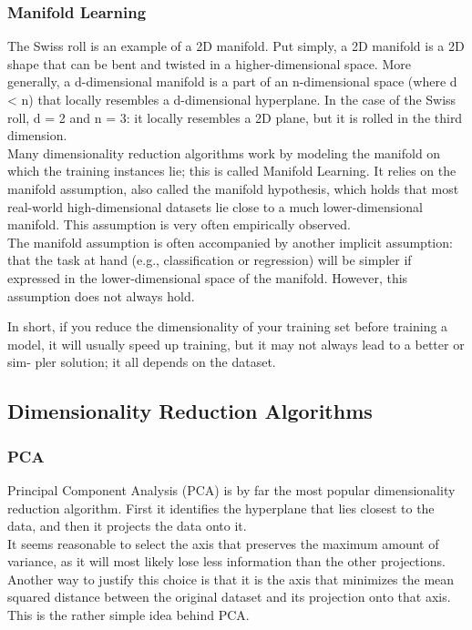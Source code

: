\documentclass[french]{article}
\begin{document}
\subsubsection{Manifold Learning}

The Swiss roll is an example of a 2D manifold. Put simply, a 2D manifold is a 2D shape that can be bent and twisted in a higher-dimensional space. More generally, a d-dimensional manifold is a part of an n-dimensional space (where d < n) that locally resembles a d-dimensional hyperplane. In the case of the Swiss roll, d = 2 and n = 3: it locally resembles a 2D plane, but it is rolled in the third dimension. \\

Many dimensionality reduction algorithms work by modeling the manifold on which the training instances lie; this is called Manifold Learning. It relies on the manifold assumption, also called the manifold hypothesis, which holds that most real-world high-dimensional datasets lie close to a much lower-dimensional manifold. This assumption is very often empirically observed.\\

The manifold assumption is often accompanied by another implicit assumption: that the task at hand (e.g., classification or regression) will be simpler if expressed in the lower-dimensional space of the manifold. However, this assumption does not always hold.

In short, if you reduce the dimensionality of your training set before training a model, it will usually speed up training, but it may not always lead to a better or sim‐ pler solution; it all depends on the dataset.

\subsection{Dimensionality Reduction Algorithms}

\subsubsection{PCA}

Principal Component Analysis (PCA) is by far the most popular dimensionality reduction algorithm. First it identifies the hyperplane that lies closest to the data, and then it projects the data onto it.\\

It seems reasonable to select the axis that preserves the maximum amount of variance, as it will most likely lose less information than the other projections. Another way to justify this choice is that it is the axis that minimizes the mean squared distance between the original dataset and its projection onto that axis. This is the rather simple idea behind PCA.\\
\end{document}
